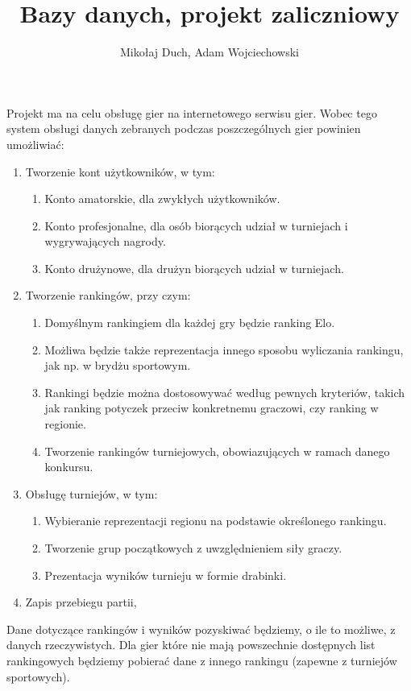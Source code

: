 \documentclass[10pt]{article}
\date{}
\title{\vspace*{-30pt} Bazy danych, projekt zaliczniowy}
\author{Mikołaj Duch, Adam Wojciechowski}
\begin{document}
    \maketitle

    Projekt ma na celu obsługę gier na internetowego serwisu gier. 
    Wobec tego system obsługi danych zebranych podczas poszczególnych gier powinien umożliwiać:
    \begin{enumerate}
        \item Tworzenie kont użytkowników, w tym:
            \begin{enumerate}
                \item Konto amatorskie, dla zwykłych użytkowników.
                \item Konto profesjonalne, dla osób biorących udział w turniejach i wygrywających nagrody.
                \item Konto drużynowe, dla drużyn biorących udział w turniejach.
            \end{enumerate}
        \item Tworzenie rankingów, przy czym:
        \begin{enumerate}
            \item Domyślnym rankingiem dla każdej gry będzie ranking Elo. 
            \item Możliwa będzie także reprezentacja innego sposobu wyliczania rankingu, jak np. w brydżu 
            sportowym.
            \item Rankingi będzie można dostosowywać według pewnych kryteriów, takich jak ranking 
            potyczek przeciw konkretnemu graczowi, czy ranking w regionie.
            \item Tworzenie rankingów turniejowych, obowiazujących w ramach danego konkursu.
        \end{enumerate}
        \item Obsługę turniejów, w tym:
            \begin{enumerate}
                \item Wybieranie reprezentacji regionu na podstawie określonego rankingu.
                \item Tworzenie grup początkowych z uwzględnieniem siły graczy.
                \item Prezentacja wyników turnieju w formie drabinki.
            \end{enumerate}
        \item Zapis przebiegu partii,
    \end{enumerate}

    Dane dotyczące rankingów i wyników pozyskiwać będziemy, o ile to możliwe, z danych rzeczywistych.
    Dla gier które nie mają powszechnie dostępnych list rankingowych będziemy pobierać dane z innego 
    rankingu (zapewne z turniejów sportowych). 

    
\end{document}

